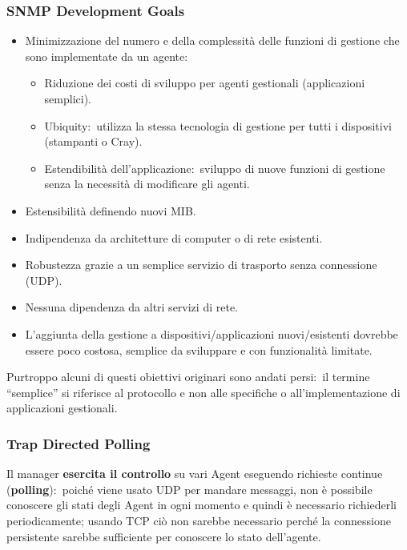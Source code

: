 \subsubsection{SNMP Development Goals}

\begin{itemize}
    \item Minimizzazione del numero e della complessità delle funzioni di gestione che sono implementate da un agente:\
          \begin{itemize}
              \item Riduzione dei costi di sviluppo per agenti gestionali (applicazioni semplici).
              \item Ubiquity:\ utilizza la stessa tecnologia di gestione per tutti i dispositivi (stampanti o Cray).
              \item Estendibilità dell'applicazione:\ sviluppo di nuove funzioni di gestione senza la necessità di modificare gli agenti.
          \end{itemize}
    \item Estensibilità definendo nuovi MIB.
    \item Indipendenza da architetture di computer o di rete esistenti.
    \item Robustezza grazie a un semplice servizio di trasporto senza connessione (UDP).%
    \item Nessuna dipendenza da altri servizi di rete.
    \item L'aggiunta della gestione a dispositivi{\slash}applicazioni nuovi{\slash}esistenti dovrebbe essere poco costosa, semplice da sviluppare e con funzionalità limitate.
\end{itemize}
Purtroppo alcuni di questi obiettivi originari sono andati persi:\ il termine ``semplice'' si riferisce al protocollo e non alle specifiche o all'implementazione di applicazioni gestionali.

\subsubsection{Trap Directed Polling}

Il manager \textbf{esercita il controllo} su vari Agent eseguendo richieste continue (\textbf{polling}):\ poiché viene usato UDP per mandare messaggi, non è possibile conoscere gli stati degli Agent in ogni momento e quindi è necessario richiederli periodicamente; usando TCP ciò non sarebbe necessario perché la connessione persistente sarebbe sufficiente per conoscere lo stato dell'agente.\

